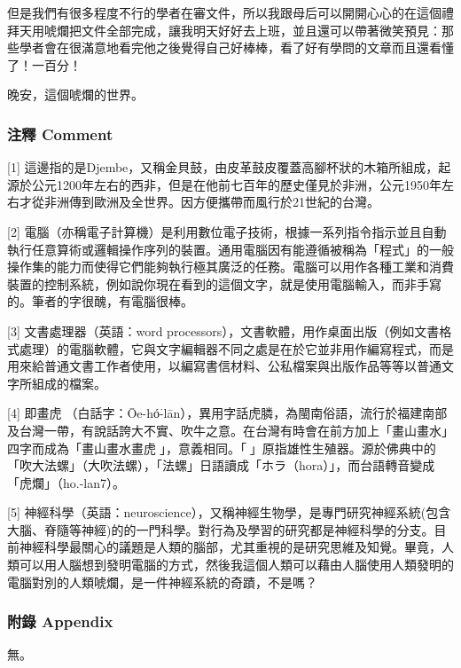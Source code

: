 \documentclass[a5paper, 12pt
]{book}
\begin{document}
但是我們有很多程度不行的學者在審文件，所以我跟母后可以開開心心的在這個禮拜天用唬爛把文件全部完成，讓我明天好好去上班，並且還可以帶著微笑預見：那些學者會在很滿意地看完他之後覺得自己好棒棒，看了好有學問的文章而且還看懂了！一百分！

晚安，這個唬爛的世界。

\hypertarget{ux6ce8ux91cb-comment-1}{%
\subsubsection{注釋 Comment}\label{ux6ce8ux91cb-comment-1}}

{[}1{]}
這邊指的是Djembe，又稱金貝鼓，由皮革鼓皮覆蓋高腳杯狀的木箱所組成，起源於公元1200年左右的西非，但是在他前七百年的歷史僅見於非洲，公元1950年左右才從非洲傳到歐洲及全世界。因方便攜帶而風行於21世紀的台灣。

{[}2{]}
電腦（亦稱電子計算機）是利用數位電子技術，根據一系列指令指示並且自動執行任意算術或邏輯操作序列的裝置。通用電腦因有能遵循被稱為「程式」的一般操作集的能力而使得它們能夠執行極其廣泛的任務。電腦可以用作各種工業和消費裝置的控制系統，例如說你現在看到的這個文字，就是使用電腦輸入，而非手寫的。筆者的字很醜，有電腦很棒。

{[}3{]} 文書處理器（英語：word
processors），文書軟體，用作桌面出版（例如文書格式處理）的電腦軟體，它與文字編輯器不同之處是在於它並非用作編寫程式，而是用來給普通文書工作者使用，以編寫書信材料、公私檔案與出版作品等等以普通文字所組成的檔案。

{[}4{]}
即畫虎𡳞（白話字：Ōe-hó͘-lān），異用字話虎膦，為閩南俗語，流行於福建南部及台灣一帶，有說話誇大不實、吹牛之意。在台灣有時會在前方加上「畫山畫水」四字而成為「畫山畫水畫虎𡳞」，意義相同。「𡳞」原指雄性生殖器。源於佛典中的「吹大法螺」（大吹法螺），「法螺」日語讀成「ホラ（hora）」，而台語轉音變成「虎爛」（ho.-lan7）。

{[}5{]}
神經科學（英語：neuroscience），又稱神經生物學，是專門研究神經系統(包含大腦、脊隨等神經)的的一門科學。對行為及學習的研究都是神經科學的分支。目前神經科學最關心的議題是人類的腦部，尤其重視的是研究思維及知覺。畢竟，人類可以用人腦想到發明電腦的方式，然後我這個人類可以藉由人腦使用人類發明的電腦對別的人類唬爛，是一件神經系統的奇蹟，不是嗎？

\hypertarget{ux9644ux9304-appendix-1}{%
\subsubsection{附錄 Appendix}\label{ux9644ux9304-appendix-1}}

無。
\end{document}
